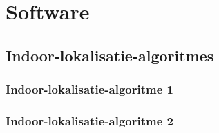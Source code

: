 \chapter{Software}
\section{Indoor-lokalisatie-algoritmes}
\subsection{Indoor-lokalisatie-algoritme 1}


\subsection{Indoor-lokalisatie-algoritme 2}
